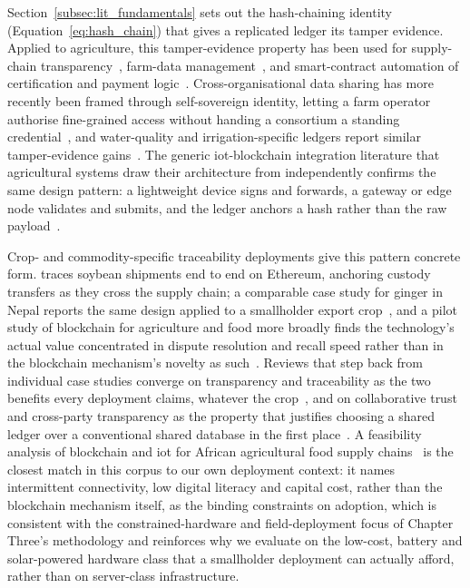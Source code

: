 Section~\ref{subsec:lit_fundamentals} sets out the hash-chaining identity
(Equation~\ref{eq:hash_chain}) that gives a replicated ledger its tamper
evidence. Applied to agriculture, this tamper-evidence property has been
used for supply-chain
transparency~\cite{tian2016agri, kamilaris2019rise, oh2025foodsafety, galvez2018future, tian2017traceability, reyna2018blockchain, tian2017agri, anonndsupplychain}, farm-data
management~\cite{lin2018blockchain, ferrag2020security, haque2024scalable, zhang2019blockchain, ali2023farmDataTampering}, and smart-contract
automation of certification and payment
logic~\cite{rama2021systematic, patil2022blockchain, nguyen2022smartFarmingSC, tian2017agri}. Cross-organisational data
sharing has more recently been framed through self-sovereign identity,
letting a farm operator authorise fine-grained access without handing a
consortium a standing credential~\cite{amraouy2025ssi}, and water-quality
and irrigation-specific ledgers report similar tamper-evidence
gains~\cite{saito2025blockchainWaterQuality, arshad2022blockchainBenefits, ali2023farmDataTampering, rahman2019agriSecurity}. The generic \gls{iot}-blockchain integration
literature that agricultural systems draw their architecture from
independently confirms the same design pattern: a lightweight device signs
and forwards, a gateway or edge node validates and submits, and the ledger
anchors a hash rather than the raw
payload~\cite{dorri2017blockchain, nguyen2019blockchain, xu2020making, reyna2018blockchain, benedict2021decentralized}.

Crop- and commodity-specific traceability deployments give this pattern
concrete form. \textcite{salah2019blockchain} traces soybean shipments end
to end on Ethereum, anchoring custody transfers as they cross the supply
chain; a comparable case study for ginger in Nepal reports the same
design applied to a smallholder export
crop~\cite{anonndblockchainbased}, and a pilot study of blockchain for
agriculture and food more broadly finds the technology's actual value
concentrated in dispute resolution and recall speed rather than in the
blockchain mechanism's novelty as such~\cite{liu2021traceableSupply}.
Reviews that step back from individual case studies converge on
transparency and traceability as the two benefits every deployment claims,
whatever the crop~\cite{anonndblockchaintechnology2}, and on collaborative
trust and cross-party transparency as the property that justifies choosing
a shared ledger over a conventional shared database in the first
place~\cite{kumar2024collaborativenetworks}. A feasibility analysis of
blockchain and \gls{iot} for African agricultural food supply
chains~\cite{tang2024feasibility} is the closest match in this corpus to
our own deployment context: it names intermittent connectivity, low
digital literacy and capital cost, rather than the blockchain mechanism
itself, as the binding constraints on adoption, which is consistent with
the constrained-hardware and field-deployment focus of Chapter Three's
methodology and reinforces why we evaluate on the low-cost, battery and
solar-powered hardware class that a smallholder deployment can actually
afford, rather than on server-class infrastructure.


